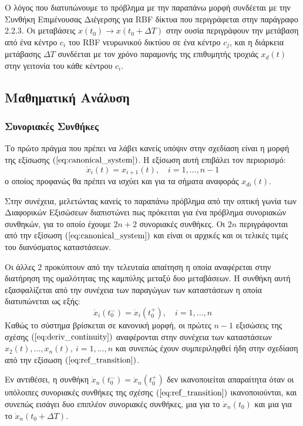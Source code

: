 Ο λόγος που διατυπώνουμε το πρόβλημα με την παραπάνω μορφή συνδέεται με την Συνθήκη Επιμένουσας Διέγερσης για RBF δίκτυα που περιγράφεται στην παράγραφο 2.2.3. Οι μεταβάσεις $x(t_0) \rightarrow x(t_0+ \Delta T)$ στην ουσία περιγράφουν την μετάβαση από ένα κέντρο $c_i$ του RBF νευρωνικού δικτύου σε ένα κέντρο $c_j$, και η διάρκεια μετάβασης $\Delta T$ συνδέεται με τον χρόνο παραμονής της επιθυμητής τροχιάς $x_d(t)$ στην γειτονία του κάθε κέντρου $c_i$.

\subsection{Μαθηματική Ανάλυση}
\subsubsection{Συνοριακές Συνθήκες}
Το πρώτο πράγμα που πρέπει να λάβει κανείς υπόψιν στην σχεδίαση είναι η μορφή της εξίσωσης $(\ref{eq:canonical_system})$. Η εξίσωση αυτή επιβάλει τον περιορισμό:
\begin{equation*}
	\dot{x}_{i}(t) = x_{i+1}(t), \quad i=1,\dots,n-1
\end{equation*}
ο οποίος προφανώς θα πρέπει να ισχύει και για τα σήματα αναφοράς $x_{di}(t)$. 

Στην συνέχεια, μελετώντας κανείς το παραπάνω πρόβλημα από την οπτική γωνία των Διαφορικών Εξισώσεων διαπιστώνει πως πρόκειται για ένα πρόβλημα συνοριακών συνθηκών, για το οποίο έχουμε $2n+2$ συνοριακές συνθήκες. Οι $2n$ περιγράφονται από την εξίσωση $(\ref{eq:canonical_system})$ και είναι οι αρχικές και οι τελικές τιμές του διανύσματος καταστάσεων.

Οι άλλες $2$ προκύπτουν από την τελευταία απαίτηση η οποία αναφέρεται στην διατήρηση της ομαλότητας της καμπύλης μεταξύ δυο μεταβάσεων. Η συνθήκη αυτή εξασφαλίζεται από την συνέχεια των παραγώγων των καταστάσεων η οποία διατυπώνεται ως εξής:
\begin{equation}
	\dot{x}_{i}(t_0^-) = \dot{x}_{i}(t_0^+), \quad i=1,\dots,n
	\label{eq:deriv_continuity}
\end{equation}
Καθώς το σύστημα βρίσκεται σε κανονική μορφή, οι πρώτες $n-1$ εξισώσεις της σχέσης $(\ref{eq:deriv_continuity})$ αναφέρονται στην συνέχεια των καταστάσεων $x_2(t), \dots, x_n(t), \: i=1,\dots,n$ και συνεπώς έχουν συμπεριληφθεί ήδη στην σχεδίαση από την εξίσωση $(\ref{eq:ref_transition})$. 

Εν αντιθέσει, η συνθήκη $\dot{x}_{n}(t_0^-) = \dot{x}_{n}(t_0^+)$ δεν ικανοποιείται απαραίτητα όταν οι υπόλοιπες συνοριακές συνθήκες της σχέσης $(\ref{eq:ref_transition})$ ικανοποιούνται, και συνεπώς εισάγει δυο επιπλέον συνοριακές συνθήκες, μια για το $\dot{x}_{n}(t_0)$ και μια για το $\dot{x}_{n}(t_0+\Delta T)$.

